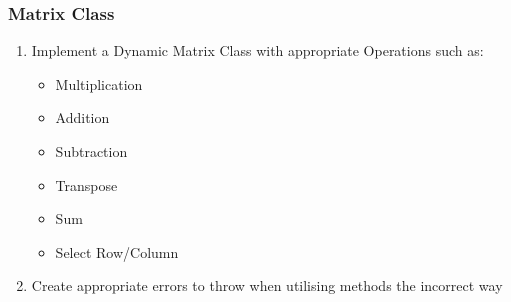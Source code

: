 \begin{flushleft}
            \subsubsection*{Matrix Class}
                \begin{enumerate}
                    \item Implement a Dynamic Matrix Class with appropriate Operations such as:
                        \begin{itemize}
                            \item Multiplication
                            \item Addition
                            \item Subtraction
                            \item Transpose
                            \item Sum
                            \item Select Row/Column
                        \end{itemize}
                    \item Create appropriate errors to throw when utilising methods the incorrect way
                \end{enumerate}   

\end{flushleft}
